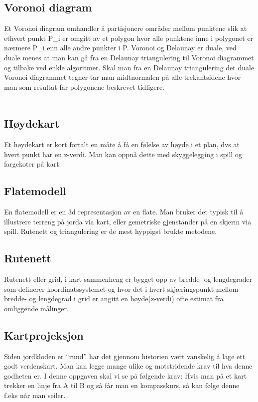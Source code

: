 \documentclass[norsk]{article}
\begin{document}
\subsection{Voronoi diagram}
Et Voronoi diagram omhandler å partisjonere områder mellom punktene slik at
ethvert punkt P\_i er omgitt av et polygon hvor alle punktene inne i
polygonet er nærmere P\_i enn alle andre punkter i P.
Voronoi og Delaunay er duale, ved duale menes at man kan gå fra en Delaunay
triangulering til Voronoi diagrammet og tilbake ved enkle algoritmer.
Skal man fra en Delaunay triangulering det duale Voronoi diagrammet tegner
tar man midtnormalen på alle trekantsidene hvor man som resultat får polygonene
beskrevet tidligere.
\\\\
\subsection{Høydekart}
Et høydekart er kort fortalt en måte å få en følelse av høyde i et
plan, dvs at hvert punkt har en z-verdi. Man kan oppnå dette med
skyggelegging i spill og fargekoter på kart.

\subsection{Flatemodell}
En flatemodell er en 3d representasjon av en flate. 
Man bruker det typisk til å illustrere terreng på jorda via kart, eller
gemetriske gjenstander på en skjerm via spill. Rutenett og triangulering 
er de mest hyppigst brukte metodene.

\subsection{Rutenett}
Rutenett eller grid, i kart sammenheng er bygget opp av bredde- og
lengdegrader som definerer koordinatssystemet og hvor det i hvert 
skjæringspunkt mellom bredde- og lengdegrad i grid er angitt en høyde(z-verdi)
ofte estimat fra omliggende målinger.

\subsection{Kartprojeksjon}
Siden jordkloden er ``rund'' har det gjennom historien vært vanskelig
å lage ett godt verdenskart. Man kan legge mange ulike og motstridende
krav til hva denne godheten er. I denne oppgaven skal vi se på
følgende krav: Hvis man på et kart trekker en linje fra A til B og
så får man en kompasskurs, så kan følge denne f.eks når man seiler. 
\end{document}
